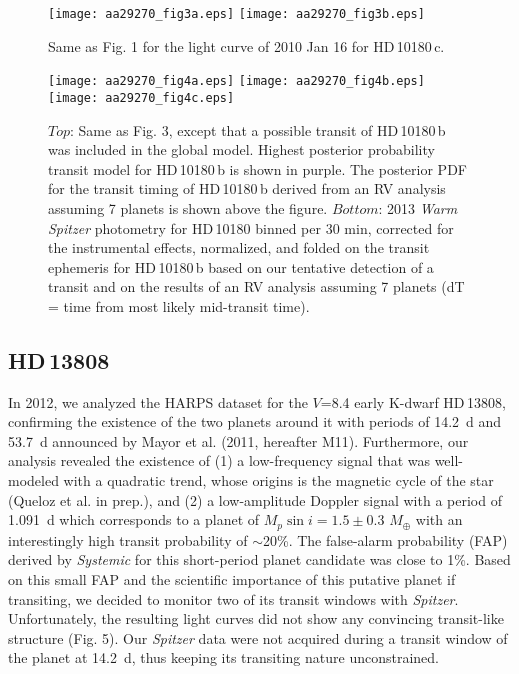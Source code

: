 \documentclass[traditabstract]{aa}
\begin{document}
\begin{figure}
\label{fig:3}
\centering                     
\texttt{[image: aa29270\_fig3a.eps]}
\texttt{[image: aa29270\_fig3b.eps]}
\caption{Same as Fig. 1 for the light curve of 2010 Jan 16 for HD\,10180\,c.}
\end{figure} 

\begin{figure}
\label{fig:4}
\centering                     
\texttt{[image: aa29270\_fig4a.eps]}
\texttt{[image: aa29270\_fig4b.eps]}
\texttt{[image: aa29270\_fig4c.eps]}
\caption{$Top$: Same as Fig. 3, except that  a possible transit of HD\,10180\,b was included in the global model. Highest posterior probability transit model for HD\,10180\,b is shown in purple. The posterior PDF for the transit timing of HD\,10180\,b derived from an RV analysis assuming 7 planets is shown above the figure.  $Bottom$: 2013 {\it Warm Spitzer} photometry for HD\,10180 binned   per 30 min,  corrected for the instrumental effects, normalized, and folded on the transit ephemeris for HD\,10180\,b based on our tentative detection  of a transit and on the results of an RV analysis assuming 7 planets (dT = time from most likely mid-transit time). }
\end{figure} 

\subsection{HD\,13808}

In 2012, we analyzed the HARPS dataset for the $V$=8.4 early K-dwarf HD\,13808, confirming the existence  of the two planets around it with periods of  14.2~d and 
53.7~d announced by Mayor et al. (2011, hereafter M11). Furthermore, our analysis revealed the existence of (1) a low-frequency signal that was well-modeled with a quadratic trend, whose origins is the magnetic cycle of the star (Queloz et al. in prep.), and (2) a low-amplitude Doppler signal with a period of 1.091~d which corresponds to a planet of $M_p\sin{i} = 1.5 \pm 0.3$ $M_{\oplus}$ 
with an interestingly high transit probability of $\sim$20\%. The false-alarm probability (FAP) derived by {\it Systemic} for this short-period planet candidate was close to 1\%.
Based on this small FAP and the scientific importance of this putative planet if transiting, we decided to monitor two of its transit windows with {\it Spitzer}. 
Unfortunately, the resulting light curves did not show any convincing transit-like structure (Fig. 5). Our {\it Spitzer} data were not acquired during a transit window of the planet at 14.2~d, thus keeping its transiting nature unconstrained. 
\end{document}
